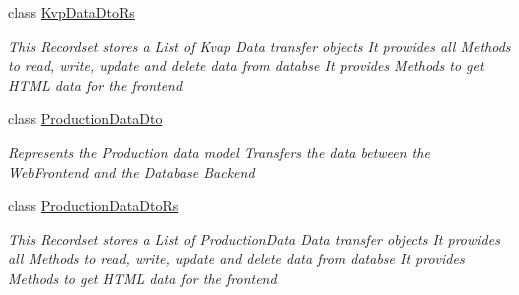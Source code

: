 \begin{DoxyCompactItemize}
class \hyperlink{classkpi_mvc_api_1_1_data_transfer_objects_1_1_kvp_data_dto_rs}{Kvp\+Data\+Dto\+Rs}
\begin{DoxyCompactList}\small\item\em This Recordset stores a List of Kvap Data transfer objects It prowides all Methods to read, write, update and delete data from databse It provides Methods to get H\+T\+ML data for the frontend \end{DoxyCompactList}\item 
class \hyperlink{classkpi_mvc_api_1_1_data_transfer_objects_1_1_production_data_dto}{Production\+Data\+Dto}
\begin{DoxyCompactList}\small\item\em Represents the Production data model Transfers the data between the Web\+Frontend and the Database Backend \end{DoxyCompactList}\item 
class \hyperlink{classkpi_mvc_api_1_1_data_transfer_objects_1_1_production_data_dto_rs}{Production\+Data\+Dto\+Rs}
\begin{DoxyCompactList}\small\item\em This Recordset stores a List of Production\+Data Data transfer objects It prowides all Methods to read, write, update and delete data from databse It provides Methods to get H\+T\+ML data for the frontend \end{DoxyCompactList}\end{DoxyCompactItemize}
